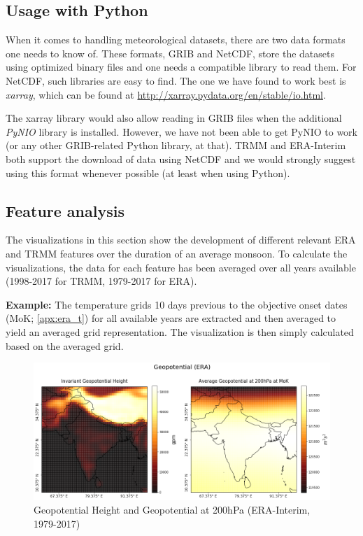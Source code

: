 \subsection{Usage with Python}
When it comes to handling meteorological datasets, there are two data formats one needs to know of. These formats, GRIB and NetCDF, store the datasets using optimized binary files and one needs a compatible library to read them. For NetCDF, such libraries are easy to find. The one we have found to work best is \textit{xarray}, which can be found at \url{http://xarray.pydata.org/en/stable/io.html}.

The xarray library would also allow reading in GRIB files when the additional \textit{PyNIO} library is installed. However, we have not been able to get PyNIO to work (or any other GRIB-related Python library, at that). TRMM and ERA-Interim both support the download of data using NetCDF and we would strongly suggest using this format whenever possible (at least when using Python).

\clearpage
\subsection{Feature analysis}
\label{apx:era_features}
The visualizations in this section show the development of different relevant ERA and TRMM features over the duration of an average monsoon. To calculate the visualizations, the data for each feature has been averaged over all years available (1998-2017 for TRMM, 1979-2017 for ERA).

\textbf{Example:} The temperature grids 10 days previous to the objective onset dates (MoK; \ref{apx:era_t}) for all available years are extracted and then averaged to yield an averaged grid representation. The visualization is then simply calculated based on the averaged grid.

\begin{figure}[h]
  \centering
  \includegraphics[width=\linewidth]{./99_appendix/img/geopotential}
  \caption{Geopotential Height and Geopotential at 200hPa (ERA-Interim, 1979-2017)}
  \label{apx:era_geopotential}
\end{figure}

